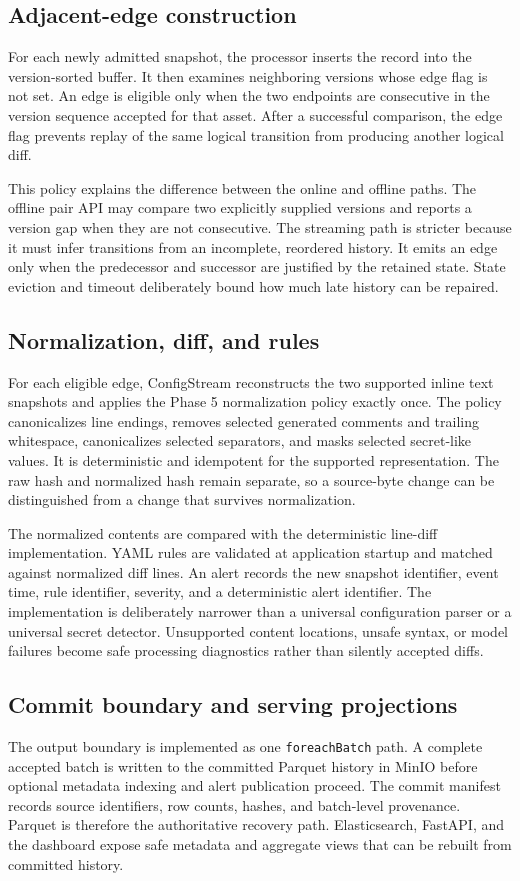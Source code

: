 \documentclass[a4paper,11pt]{article}
\begin{document}
\subsection{Adjacent-edge construction}
For each newly admitted snapshot, the processor inserts the record into the version-sorted buffer. It then examines neighboring versions whose edge flag is not set. An edge is eligible only when the two endpoints are consecutive in the version sequence accepted for that asset. After a successful comparison, the edge flag prevents replay of the same logical transition from producing another logical diff.

This policy explains the difference between the online and offline paths. The offline pair API may compare two explicitly supplied versions and reports a version gap when they are not consecutive. The streaming path is stricter because it must infer transitions from an incomplete, reordered history. It emits an edge only when the predecessor and successor are justified by the retained state. State eviction and timeout deliberately bound how much late history can be repaired.

\subsection{Normalization, diff, and rules}
For each eligible edge, ConfigStream reconstructs the two supported inline text snapshots and applies the Phase 5 normalization policy exactly once. The policy canonicalizes line endings, removes selected generated comments and trailing whitespace, canonicalizes selected separators, and masks selected secret-like values. It is deterministic and idempotent for the supported representation. The raw hash and normalized hash remain separate, so a source-byte change can be distinguished from a change that survives normalization.

The normalized contents are compared with the deterministic line-diff implementation. YAML rules are validated at application startup and matched against normalized diff lines. An alert records the new snapshot identifier, event time, rule identifier, severity, and a deterministic alert identifier. The implementation is deliberately narrower than a universal configuration parser or a universal secret detector. Unsupported content locations, unsafe syntax, or model failures become safe processing diagnostics rather than silently accepted diffs.

\subsection{Commit boundary and serving projections}
The output boundary is implemented as one \texttt{foreachBatch} path. A complete accepted batch is written to the committed Parquet history in MinIO before optional metadata indexing and alert publication proceed. The commit manifest records source identifiers, row counts, hashes, and batch-level provenance. Parquet is therefore the authoritative recovery path. Elasticsearch, FastAPI, and the dashboard expose safe metadata and aggregate views that can be rebuilt from committed history.
\end{document}
